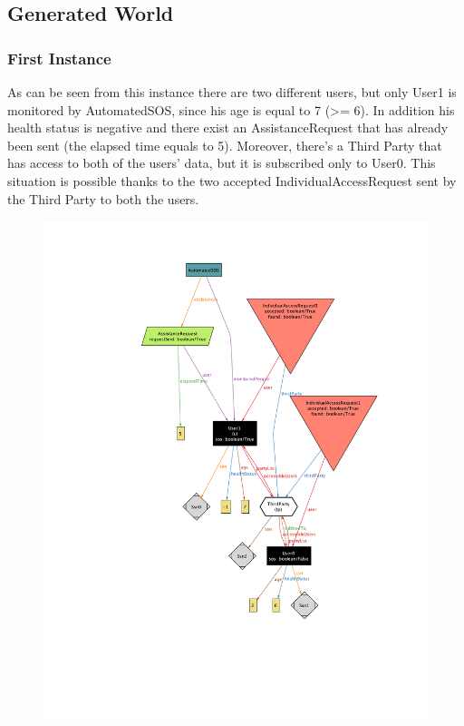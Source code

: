 \documentclass[12pt,a4paper]{article}
\begin{document}
	\subsection{Generated World}
		\subsubsection{First Instance}
			As can be seen from this instance there are two different users, but only User1 is monitored by AutomatedSOS, since his age is equal to 7 (>= 6). In addition his health status is negative and there exist an AssistanceRequest that has already been sent (the elapsed time equals to 5). 
			Moreover, there's a Third Party that has access to both of the users' data, but it is subscribed only to User0. This situation is possible thanks to the two accepted IndividualAccessRequest sent by the Third Party to both the users.
			\begin{figure}[H]
				\centering
				\includegraphics[height=1.1\linewidth]{Images/first-world}
				\label{fig:first-world}
			\end{figure}
\end{document}
